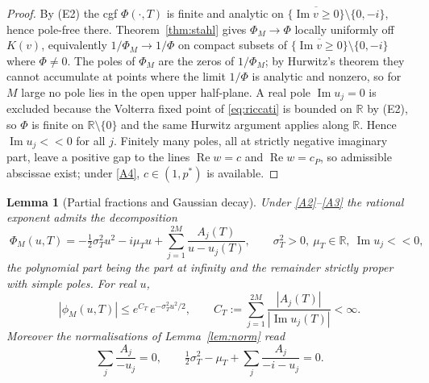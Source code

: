 \documentclass[11pt]{article}
\newtheorem{lemma}[theorem]{Lemma}
\newcommand{\R}{\mathbb{R}}
\DeclareMathOperator{\Real}{Re}
\DeclareMathOperator{\Imag}{Im}
\begin{document}
\begin{proof}
By \textup{(E2)} the cgf $\Phi(\cdot,T)$ is finite and analytic on
$\overline{\{\Imag v\ge0\}}\setminus\{0,-i\}$, hence pole-free there.
Theorem~\ref{thm:stahl} gives $\Phi_M\to\Phi$ locally uniformly off
$K(v)$, equivalently $1/\Phi_M\to1/\Phi$ on compact subsets of
$\overline{\{\Imag v\ge0\}}\setminus\{0,-i\}$ where $\Phi\neq0$. The poles
of $\Phi_M$ are the zeros of $1/\Phi_M$; by Hurwitz's theorem they cannot
accumulate at points where the limit $1/\Phi$ is analytic and nonzero, so
for $M$ large no pole lies in the open upper half-plane. A real pole
$\Imag u_j=0$ is excluded because the Volterra fixed point of
\eqref{eq:riccati} is bounded on $\R$ by \textup{(E2)}, so $\Phi$ is finite
on $\R\setminus\{0\}$ and the same Hurwitz argument applies along $\R$.
Hence $\Imag u_j<<0$ for all $j$. Finitely many poles, all at strictly
negative imaginary part, leave a positive gap to the lines $\Real w=c$ and
$\Real w=c_P$, so admissible abscissae exist; under \ref{A4}, $c\in(1,p^*)$
is available.
\end{proof}

\begin{lemma}[Partial fractions and Gaussian decay]\label{lem:decay}
Under \ref{A2}--\ref{A3} the rational exponent admits the decomposition
\begin{equation}\label{eq:PFE}
\boxed{\;\Phi_M(u,T)=-\tfrac12\sigma_T^2u^2-i\mu_T u
+\sum_{j=1}^{2M}\frac{A_j(T)}{u-u_j(T)},
\qquad \sigma_T^2>0,\ \mu_T\in\R,\ \Imag u_j<<0,\;}
\end{equation}
the polynomial part being the part at infinity and the remainder strictly
proper with simple poles. For real $u$,
\begin{equation}\label{eq:gauss-decay}
|\phi_M(u,T)|\le e^{C_T}\,e^{-\sigma_T^2u^2/2},\qquad
C_T:=\sum_{j=1}^{2M}\frac{|A_j(T)|}{|\Imag u_j(T)|}<\infty .
\end{equation}
Moreover the normalisations of Lemma~\ref{lem:norm} read
\begin{equation}\label{eq:norm-constraints}
\sum_{j}\frac{A_j}{-u_j}=0,\qquad
\tfrac12\sigma_T^2-\mu_T+\sum_j\frac{A_j}{-i-u_j}=0 .
\end{equation}
\end{lemma}
\end{document}
